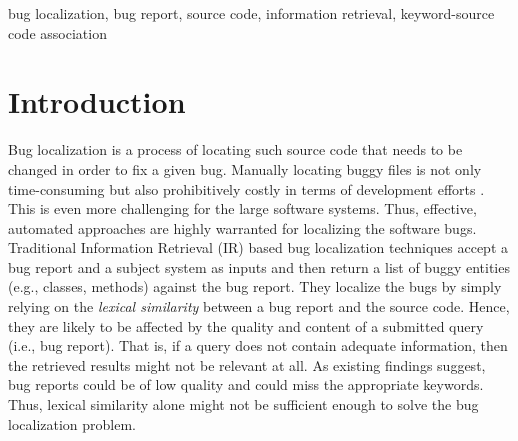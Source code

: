 \documentclass[conference]{IEEEtran}
\begin{document}
\begin{IEEEkeywords}
bug localization, bug report, source code, information retrieval, keyword-source code association
\end{IEEEkeywords}

\section{Introduction}
Bug localization is a process of locating such source code that needs to be changed in order to fix a given bug. 
Manually locating buggy files is not only time-consuming but also prohibitively costly in terms of development efforts \cite{Wang}. This is even more challenging for the large software systems. Thus, effective, automated approaches are highly warranted for localizing the software bugs. 
Traditional Information Retrieval (IR) based bug localization techniques \cite{Saha,Jian} accept a bug report and a subject system as inputs and then return a list of buggy entities (e.g., classes, methods) against the bug report. They localize the bugs by simply relying on the \emph{lexical similarity} between a bug report and the source code. 
Hence, they are likely to be affected by the quality and content of a submitted query (i.e., bug report). That is, if a query does not contain adequate information, then the retrieved results might not be relevant at all. As existing findings \cite{parninireval,fse2018masud} suggest, bug reports could be of low quality and could miss the appropriate keywords. 
 Thus, lexical similarity alone might not be sufficient enough to solve the bug localization problem. 

\end{document}
